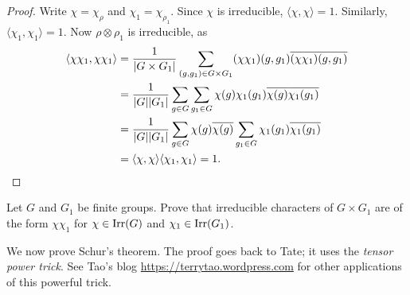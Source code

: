 \begin{proof}
    Write $\chi=\chi_{\rho}$ and $\chi_1=\chi_{\rho_1}$. Since
    $\chi$ is irreducible, $\langle\chi,\chi\rangle=1$. Similarly, 
    $\langle\chi_1,\chi_1\rangle=1$. Now
    $\rho\otimes\rho_1$ is irreducible, as 
    \begin{align*}
    \langle\chi\chi_1,\chi\chi_1\rangle
    &=\frac{1}{|G\times G_1|}\sum_{(g,g_1)\in G\times G_1}(\chi\chi_1)(g,g_1)\overline{(\chi\chi_1)(g,g_1)}\\
    &=\frac{1}{|G||G_1|}\sum_{g\in G}\sum_{g_1\in G}\chi(g)\chi_1(g_1)\overline{\chi(g)}\overline{\chi_1(g_1)}\\
    &=\frac{1}{|G||G_1|}\sum_{g\in G}\chi(g)\overline{\chi(g)}\sum_{g_1\in G}\chi_1(g_1)\overline{\chi_1(g_1)}\\
    &=\langle\chi,\chi\rangle\langle\chi_1,\chi_1\rangle=1.\qedhere 
    \end{align*}
\end{proof}

\begin{exercise}
    Let $G$ and $G_1$ be finite groups. 
    Prove that irreducible characters of $G\times G_1$ 
    are of the form $\chi\chi_1$ for  
    $\chi\in\operatorname{Irr}(G)$ and $\chi_1\in\operatorname{Irr}(G_1)$. 
\end{exercise}

We now prove Schur's theorem. The proof goes back to Tate; it uses the 
\emph{tensor power trick}. See
Tao's blog  
\url{https://terrytao.wordpress.com} for other applications of this powerful
trick. 

